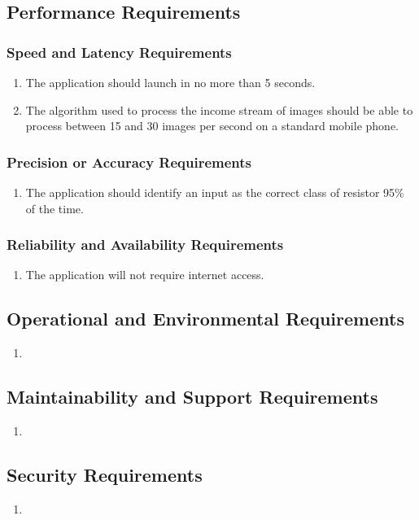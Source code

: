 \documentclass{article}
\begin{document}
\subsection{Performance Requirements}
\subsubsection{Speed and Latency Requirements}
\begin{enumerate}
\item The application should launch in no more than 5 seconds.
\item The algorithm used to process the income stream of images should be able to process between 15 and 30 images per second on a standard mobile phone.
\end{enumerate}
\subsubsection{Precision or Accuracy Requirements}
\begin{enumerate}
\item The application should identify an input as the correct class of resistor 95\% of the time.
\end{enumerate}
\subsubsection{Reliability and Availability Requirements}
\begin{enumerate}
\item The application will not require internet access.
\end{enumerate}
\subsection{Operational and Environmental Requirements}
\begin{enumerate}
\item
\end{enumerate}
\subsection{Maintainability and Support Requirements}
\begin{enumerate}
\item
\end{enumerate}
\subsection{Security Requirements}
\begin{enumerate}
\item
\end{enumerate}
\end{document}
